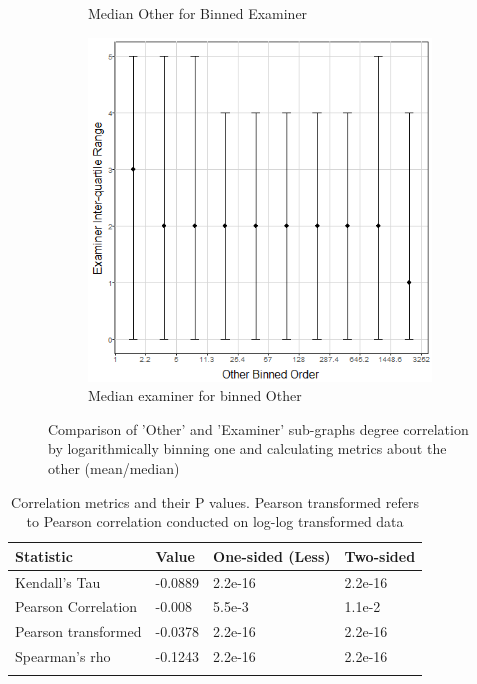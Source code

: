 \begin{figure}
\begin{subfigure}{.24\linewidth}
  \caption[]{\small Median Other for Binned Examiner }
\label{fig:MedianOtherVsExaminer}
\end{subfigure}
\begin{subfigure}{.24\linewidth}
  \centering
  \includegraphics[width=0.9\linewidth]{Figures/MedianExaminerVsOther}
  \caption[]{\small Median examiner for binned Other}
\label{fig:MedianExaminerVsOther}
\end{subfigure}
\caption[]{Comparison of 'Other' and 'Examiner' sub-graphs degree correlation by logarithmically binning one and calculating metrics about the other (mean/median) }
\label{fig:binnedAverageComparison}
\end{figure}

\begin{table}
\caption{Correlation metrics and their P values. Pearson transformed refers to Pearson correlation conducted on log-log transformed data}
\label{tab:cor}
\centering
\begin{tabular}{l l l l}
\toprule
Statistic & Value & One-sided (Less) & Two-sided \\
\midrule
Kendall's Tau & -0.0889 & 2.2e-16 & 2.2e-16 \\
Pearson Correlation & -0.008 & 5.5e-3 & 1.1e-2 \\
Pearson transformed & -0.0378 & 2.2e-16 & 2.2e-16  \\
Spearman's rho & -0.1243 & 2.2e-16 & 2.2e-16 \\
\bottomrule\\
\end{tabular}
\end{table}

